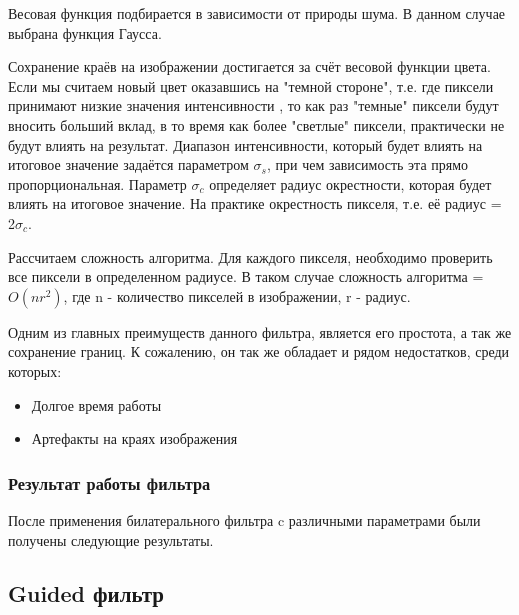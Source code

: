 Весовая функция подбирается в зависимости от природы шума. В данном случае выбрана функция Гаусса.

Сохранение краёв на изображении достигается за счёт весовой функции цвета. Если мы считаем новый цвет оказавшись на "темной стороне", т.е. где пиксели принимают низкие значения интенсивности , то как раз "темные" пиксели будут вносить больший вклад, в то время как более "светлые" пиксели, практически не будут влиять на результат. Диапазон интенсивности, который будет влиять на итоговое значение задаётся параметром $\sigma_s$,  при чем зависимость эта прямо пропорциональная.
Параметр $\sigma_c$ определяет радиус окрестности, которая будет влиять на итоговое значение. На практике окрестность пикселя, т.е. её радиус = 2$\sigma_c$.

Рассчитаем сложность алгоритма. Для каждого пикселя, необходимо проверить все пиксели в определенном радиусе. В таком случае сложность алгоритма = $O(nr^2)$, где n - количество пикселей в изображении, r - радиус. 

Одним из главных преимуществ данного фильтра, является его простота, а так же сохранение границ. К сожалению, он так же обладает и рядом недостатков, среди которых:

\begin{itemize}
	\item Долгое время работы
	\item Артефакты на краях изображения
\end{itemize}

\subsubsection{Результат работы фильтра}
После применения билатерального фильтра c различными параметрами были получены следующие результаты.

\begin{figure}[H]\label{img:bilRes}
	\begin{minipage}[H]{0.49\linewidth}
	\end{minipage}
	\begin{minipage}[H]{0.49\linewidth}
	\end{minipage}
\end{figure}


\subsection{Guided фильтр}
